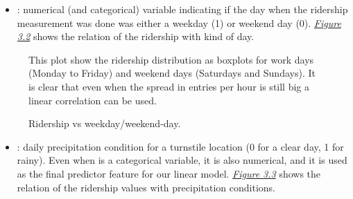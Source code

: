 \documentclass[a4paper,12pt,english]{sphinxmanual}
\begin{document}
\begin{itemize}
\item {} 
: numerical (and categorical) variable indicating if the day when
the ridership measurement was done was either a weekday (1) or weekend day (0).
{\hyperref[section2:figure32]{\emph{Figure 3.2}}} shows the relation of the ridership with kind of
day.

\end{itemize}
\begin{figure}[htbp]
\centering
\capstart

\caption{Ridership vs weekday/weekend-day.}{\small 
This plot show the ridership distribution as boxplots for work days (Monday
to Friday) and weekend days (Saturdays and Sundays). It is clear that even
when the spread in entries per hour is still big a linear correlation can
be used.
}\label{section2:figure32}\end{figure}
\begin{itemize}
\item {} 
: daily precipitation condition for a turnstile location (0 for a clear
day, 1 for rainy). Even when is a categorical variable, it is also numerical,
and it is used as the final predictor feature for our linear model.
{\hyperref[section2:figure33]{\emph{Figure 3.3}}} shows the relation of the ridership values with
precipitation conditions.

\end{itemize}
\end{document}
